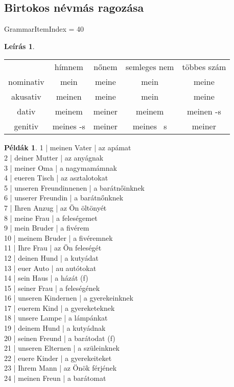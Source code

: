 \documentclass{article}
\theoremstyle{definition}
\newtheorem*{exmp}{Példák}
\newtheorem*{desc}{Leírás}
\begin{document}
\subsection{Birtokos névmás ragozása}

GrammarItemIndex = 40

\begin{desc}
\begin{tabular}{ccccc}
 & hímnem & nőnem & semleges nem & többes szám \\
nominativ & mein & meine & mein & meine \\
akusativ & meinen & meine & mein & meine \\
dativ & meinem & meiner & meinem & meinen -s \\
genitiv & meines -s & meiner & meines ~s & meiner \\
\end{tabular}
\end{desc}

\begin{exmp}
1 | meinen Vater | az apámat\\
2 | deiner Mutter | az anyágnak\\
3 | meiner Oma | a nagymamámnak\\
4 | eueren Tisch | az asztalotokat\\
5 | unseren Freundinnenen | a barátnőinknek\\
6 | unserer Freundin | a barátnőnknek\\
7 | Ihren Anzug | az Ön öltönyét\\
8 | meine Frau | a feleségemet\\
9 | mein Bruder | a fivérem\\
10 | meinem Bruder | a fivéremnek\\
11 | Ihre Frau | az Ön feleségét\\
12 | deinen Hund | a kutyádat\\
13 | euer Auto | au autótokat\\
14 | sein Haus | a házát (f)\\
15 | seiner Frau | a feleségének\\
16 | unseren Kindernen | a gyerekeinknek\\
17 | euerem Kind | a gyereketeknek\\
18 | unsere Lampe | a lámpánkat\\
19 | deinem Hund | a kutyádnak\\
20 | seinen Freund | a barátodat (f)\\
21 | unseren Elternen | a szüleinknek\\
22 | euere Kinder | a gyerekeiteket\\
23 | Ihrem Mann | az Önök férjének\\
24 | meinen Freun | a barátomat\\
\end{exmp}
\end{document}
